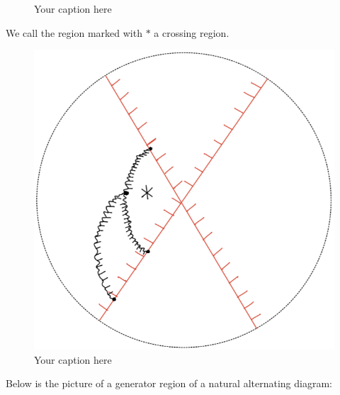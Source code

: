 \begin{definition}
\begin{enumerate}[label = (\roman*)]
\begin{figure}[H]
    \caption{Your caption here}
    \label{fig:your-label}
\end{figure}
We call the region marked with $*$ a crossing region.
\begin{figure}[H] 
    \centering
    \includegraphics[scale = 0.95]{diagrams/local_systems_on_as_diagrams/11.png} 
    \caption{Your caption here}
    \label{fig:your-label}
\end{figure}
\end{enumerate}

Below is the picture of a generator region of a natural alternating diagram:


\end{definition}
